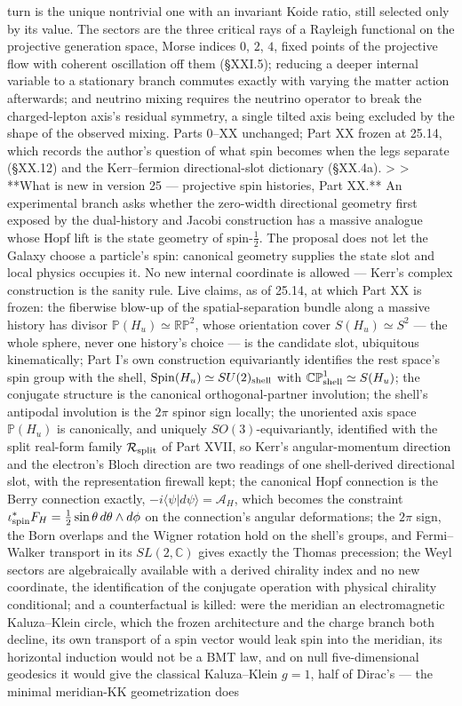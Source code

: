 turn is the unique nontrivial one with an invariant Koide ratio, still selected only by its value. The sectors are the three critical rays of a Rayleigh functional on the projective generation space, Morse indices $0$, $2$, $4$, fixed points of the projective flow with coherent oscillation off them (§XXI.5); reducing a deeper internal variable to a stationary branch commutes exactly with varying the matter action afterwards; and neutrino mixing requires the neutrino operator to break the charged-lepton axis's residual symmetry, a single tilted axis being excluded by the shape of the observed mixing. Parts 0–XX unchanged; Part XX frozen at 25.14, which records the author's question of what spin becomes when the legs separate (§XX.12) and the Kerr–fermion directional-slot dictionary (§XX.4a).
>
> **What is new in version 25 — projective spin histories, Part XX.** An experimental branch asks whether the zero-width directional geometry first exposed by the dual-history and Jacobi construction has a massive analogue whose Hopf lift is the state geometry of spin-$\tfrac12$. The proposal does not let the Galaxy choose a particle's spin: canonical geometry supplies the state slot and local physics occupies it. No new internal coordinate is allowed — Kerr's complex construction is the sanity rule. Live claims, as of 25.14, at which Part XX is frozen: the fiberwise blow-up of the spatial-separation bundle along a massive history has divisor $\mathbb P(H_u)\simeq\mathbb{RP}^2$, whose orientation cover $S(H_u)\simeq S^2$ — the whole sphere, never one history's choice — is the candidate slot, ubiquitous kinematically; Part I's own construction equivariantly identifies the rest space's spin group with the shell, ${\rm Spin}(H_u)\simeq SU(2)_{\rm shell}$ with $\mathbb{CP}^1_{\rm shell}\simeq S(H_u)$; the conjugate structure is the canonical orthogonal-partner involution; the shell's antipodal involution is the $2\pi$ spinor sign locally; the unoriented axis space $\mathbb P(H_u)$ is canonically, and uniquely $SO(3)$-equivariantly, identified with the split real-form family $\mathcal R_{\rm split}$ of Part XVII, so Kerr's angular-momentum direction and the electron's Bloch direction are two readings of one shell-derived directional slot, with the representation firewall kept; the canonical Hopf connection is the Berry connection exactly, $-i\langle\psi\vert d\psi\rangle = \mathcal A_H$, which becomes the constraint $\iota_{\rm spin}^*F_H = \tfrac12\sin\theta\,d\theta\wedge d\phi$ on the connection's angular deformations; the $2\pi$ sign, the Born overlaps and the Wigner rotation hold on the shell's groups, and Fermi–Walker transport in its $SL(2,\mathbb C)$ gives exactly the Thomas precession; the Weyl sectors are algebraically available with a derived chirality index and no new coordinate, the identification of the conjugate operation with physical chirality conditional; and a counterfactual is killed: were the meridian an electromagnetic Kaluza–Klein circle, which the frozen architecture and the charge branch both decline, its own transport of a spin vector would leak spin into the meridian, its horizontal induction would not be a BMT law, and on null five-dimensional geodesics it would give the classical Kaluza–Klein $g = 1$, half of Dirac's — the minimal meridian-KK geometrization does 